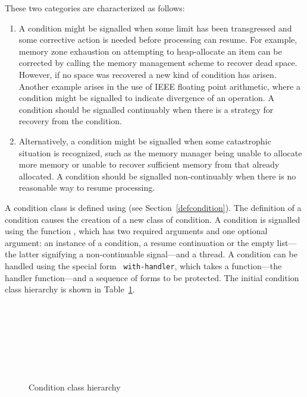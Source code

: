 \begin{optDefinition}
\noindent
These two categories are characterized as follows:
\begin{enumerate}
%
    \item {} A condition might be signalled
    when some limit has been transgressed and some corrective action is needed
    before processing can resume.  For example, memory zone exhaustion on
    attempting to heap-allocate an item can be corrected by calling the memory
    management scheme to recover dead space.  However, if no space was recovered
    a new kind of condition has arisen.  Another example arises in the use of
    IEEE floating point arithmetic, where a condition might be signalled to
    indicate divergence of an operation.  A condition should be signalled
    continuably when there is a strategy for recovery from the condition.
%
    \item {} Alternatively, a condition
    might be signalled when some catastrophic situation is recognized, such as
    the memory manager being unable to allocate more memory or unable to recover
    sufficient memory from that already allocated.  A condition should be
    signalled non-continuably when there is no reasonable way to resume
    processing.
%
\end{enumerate}
%
A condition class is defined using  (see
Section~\ref{defcondition}).  The definition of a condition causes the
creation of a new class of condition.  A condition is signalled using
the function , which has two required arguments and one
optional argument: an instance of a condition, a resume continuation
or the empty list---the latter signifying a non-continuable signal---and a
thread.  A condition can be handled using the special form {\tt
with-handler}, which takes a function---the handler function---and a
sequence of forms to be protected.  The initial condition class
hierarchy is shown in Table~\ref{condition-class-hierarchy}.
%
\begin{figure}
\caption{Condition class hierarchy}
\label{condition-class-hierarchy}
{\tt
{}\\
\tts{}\\
\tts\tts{}\\
\tts\tts{}\\
\tts\tts{}\\
\tts{}\\
}
\end{figure}
\end{optDefinition}
